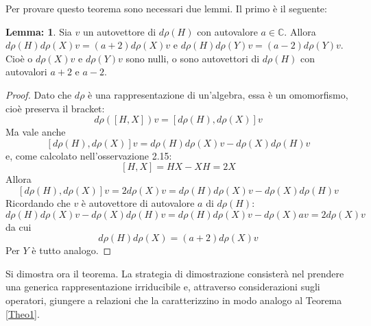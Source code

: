 \documentclass[12pt,a4paper]{report}
\theoremstyle{definition}
\theoremstyle{definition}
\theoremstyle{definition}
\newtheorem{Lem}[Def]{Lemma:}
\theoremstyle{definition}
\begin{document}
Per provare questo teorema sono necessari due lemmi. Il primo  è il seguente:
\begin{Lem}\label{Lemma1}
	Sia $v$ un autovettore di $d\rho(H)$ con autovalore $a\in\mathbb{C}$. Allora $d\rho(H)d\rho(X)v=(a+2)d\rho(X)v$ e $d\rho(H)d\rho(Y)v=(a-2)d\rho(Y)v$. Cioè o $d\rho(X)v$ e $d\rho(Y)v$ sono nulli, o sono autovettori di $d\rho(H)$ con autovalori $a+2$ e $a-2$.
\end{Lem}
\begin{proof}
	Dato che $d\rho$ è una rappresentazione di un'algebra, essa è un omomorfismo, cioè preserva il bracket:\\ $$d\rho([H,X])v=[d\rho(H),d\rho(X)]v$$
	Ma vale anche $$[d\rho(H),d\rho(X)]v=d\rho(H)d\rho(X)v-d\rho(X)d\rho(H)v$$ e, come calcolato nell'osservazione 2.15: $$[H,X]=HX-XH=2X$$ 
	Allora $$[d\rho(H),d\rho(X)]v=2d\rho(X)v=d\rho(H)d\rho(X)v-d\rho(X)d\rho(H)v$$ 
	Ricordando che $v$ è autovettore di autovalore $a$ di $d\rho(H)$:
	$$d\rho(H)d\rho(X)v-d\rho(X)d\rho(H)v=d\rho(H)d\rho(X)v-d\rho(X)av=2d\rho(X)v$$ da cui
	$$d\rho(H)d\rho(X)=(a+2)d\rho(X)v$$ 
	Per $Y$ è tutto analogo.
\end{proof}
Si dimostra ora il teorema. La strategia di dimostrazione consisterà nel prendere una generica rappresentazione irriducibile e, attraverso considerazioni sugli operatori, giungere a relazioni che la caratterizzino in modo analogo al Teorema \ref{Theo1}.
\end{document}
